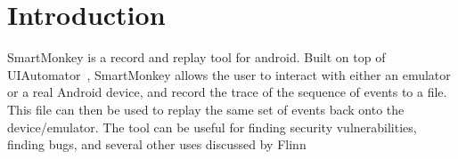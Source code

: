 \chapter{Introduction}
SmartMonkey is a record and replay tool for android. Built on top of UIAutomator~\cite{uiautomator}, SmartMonkey allows the user to interact with either an emulator or a real Android device, and record the trace of the sequence of events to a file. This file can then be used to replay the same set of events back onto the device/emulator. The tool can be useful for finding security vulnerabilities, finding bugs, and several other uses discussed by Flinn \etal~\cite{Flinn:2011:DRE:2184489.2184507}
